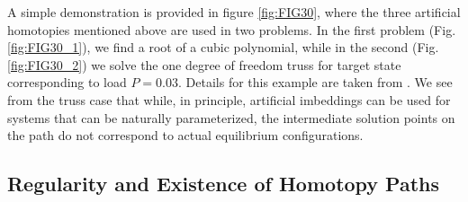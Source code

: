 \begin{figure*}[h]
	\centering
	\qquad
	\caption{Homotopy paths for \textbf{(a)} $f(x)=x^3-6x^2+21x-26=0$, with 
		starting point
		$x_0=0$ and convergence at root $x_1=2$ when $t=1$ and 
		\textbf{(b)}
		truss, with initial state the undeformed
		configuration($x_0=0$) and target load level $P=0.03$.}%
	\label{fig:FIG30}%
\end{figure*}
\clearpage
A simple demonstration is provided in figure \ref{fig:FIG30}, where the
three artificial homotopies
mentioned above are used in two problems. In the first problem
(Fig. \ref{fig:FIG30_1}), we find a root 
of a cubic polynomial, while in the second (Fig. \ref{fig:FIG30_2}) 
we solve the 
one degree of freedom truss for target state corresponding to load $P=0.03$. 
Details for this example are taken from \cite{Rheinboldt:1981}. We see
from the truss case that while, in principle, artificial imbeddings can be 
used for systems that can be naturally parameterized, the intermediate solution
points on the path do not correspond to actual equilibrium configurations. 

\subsection{Regularity and Existence of Homotopy Paths}\label{CH4-S1SS2}

